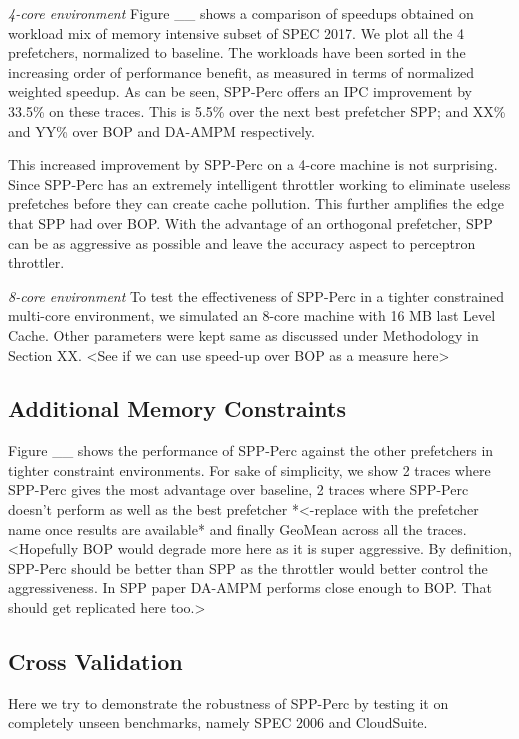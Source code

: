 \textit{4-core environment} Figure \_\_ shows a comparison of speedups
obtained on workload mix of memory intensive subset of SPEC 2017.  We
plot all the 4 prefetchers, normalized to baseline.  The workloads
have been sorted in the increasing order of performance benefit, as
measured in terms of normalized weighted speedup.  As can be seen,
SPP-Perc offers an IPC improvement by 33.5\% on these traces.  This is
5.5\% over the next best prefetcher SPP; and XX\% and YY\% over BOP
and DA-AMPM respectively.

This increased improvement by SPP-Perc on a 4-core machine is not
surprising.  Since SPP-Perc has an extremely intelligent throttler
working to eliminate useless prefetches before they can create cache
pollution.  This further amplifies the edge that SPP had over BOP.
With the advantage of an orthogonal prefetcher, SPP can be as
aggressive as possible and leave the accuracy aspect to perceptron
throttler.

\textit{8-core environment} To test the effectiveness of SPP-Perc in a
tighter constrained multi-core environment, we simulated an 8-core
machine with 16 MB last Level Cache.  Other parameters were kept same
as discussed under Methodology in Section XX.  <See if we can use
speed-up over BOP as a measure here>

\subsection{Additional Memory Constraints}
Figure \_\_ shows the performance of SPP-Perc against the other
prefetchers in tighter constraint environments.  For sake of
simplicity, we show 2 traces where SPP-Perc gives the most advantage
over baseline, 2 traces where SPP-Perc doesn't perform as well as the
best prefetcher *<-replace with the prefetcher name once results are
available* and finally GeoMean across all the traces.  <Hopefully BOP
would degrade more here as it is super aggressive.  By definition,
SPP-Perc should be better than SPP as the throttler would better
control the aggressiveness.  In SPP paper DA-AMPM performs close
enough to BOP. That should get replicated here too.>

\subsection{Cross Validation}
Here we try to demonstrate the robustness of SPP-Perc by testing it on
completely unseen benchmarks, namely SPEC 2006 and CloudSuite.


